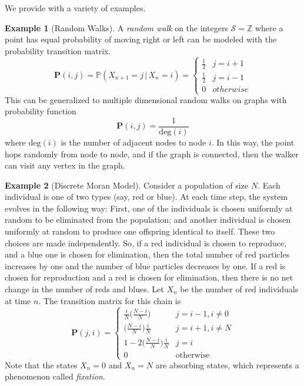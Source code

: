 \documentclass{article}
\theoremstyle{definition}
\newtheorem{example}{Example}[section]
\theoremstyle{remark}
\theoremstyle{definition}
\begin{document}
We provide with a variety of examples. 

\begin{example}[Random Walks]
A \textit{random walk} on the integers $\mathcal{S} = \mathbb{Z}$ where a point has equal probability of moving right or left can be modeled with the probability transition matrix. 
\[\mathbf{P}(i, j) = \mathbb{P}(X_{n+1} = j \, | \, X_n = i) = \begin{cases}
\frac{1}{2} & j = i + 1 \\
\frac{1}{2} & j = i - 1\\
0 & otherwise
\end{cases}\]
This can be generalized to multiple dimensional random walks on graphs with probability function 
\[\mathbf{P}(i, j) = \frac{1}{\text{deg}(i)}\]
where $\mathrm{deg}(i)$ is the number of adjacent nodes to node $i$. In this way, the point hops randomly from node to node, and if the graph is connected, then the walker can visit any vertex in the graph. 
\end{example}

\begin{example}[Discrete Moran Model]
Consider a population of size $N$. Each individual is one of two types (say, red or blue). At each time step, the system evolves in the following way: First, one of the individuals is chosen uniformly at random to be eliminated from the population; and another individual is chosen uniformly at random to produce one offspring identical to itself. These two choices are made independently. So, if a red individual is chosen to reproduce, and a blue one is chosen for elimination, then the total number of red particles increases by one and the number of blue particles decreases by one. If a red is chosen for reproduction and a red is chosen for elimination, then there is no net change in the number of reds and blues. Let $X_n$ be the number of red individuals at time $n$. The transition matrix for this chain is
\[\mathbf{P}(j, i) = \begin{cases}
\frac{i}{N} \bigg(\frac{N-i}{N} \bigg) & j=i-1, i \neq 0 \\
\bigg(\frac{N-i}{N} \bigg) \frac{i}{N} & j=i+1, i \neq N \\
1 - 2 \bigg(\frac{N-i}{N} \bigg) \frac{i}{N} & j = i \\
0 & \text{otherwise}
\end{cases}\]
Note that the states $X_n = 0$ and $X_n = N$ are absorbing states, which represents a phenomenon called \textit{fixation}. 
\end{example}
\end{document}

